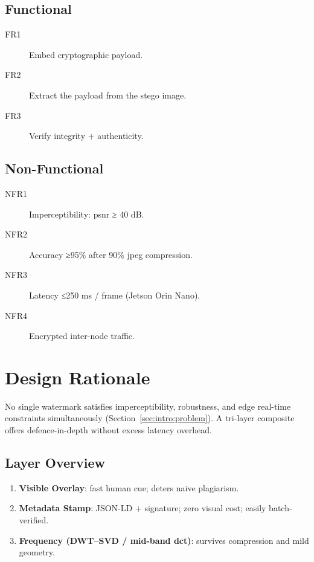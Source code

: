 \subsection{Functional}\label{subsec:functional}
\begin{description}
  \item[FR1] Embed cryptographic payload.
  \item[FR2] Extract the payload from the stego image.
  \item[FR3] Verify integrity + authenticity.
\end{description}

\subsection{Non-Functional}\label{subsec:non-functional}
\begin{description}
  \item[NFR1] Imperceptibility: \gls{psnr} ≥ 40 dB\@.
  \item[NFR2] Accuracy ≥95\% after 90\% \gls{jpeg} compression.
  \item[NFR3] Latency ≤250 ms / frame (Jetson Orin Nano).
  \item[NFR4] Encrypted inter-node traffic.
\end{description}

\section{Design Rationale}
\label{sec:deep_dive:rationale}
No single watermark satisfies imperceptibility, robustness, and edge real-time constraints simultaneously (Section~\ref{sec:intro:problem}). A tri-layer composite offers defence-in-depth without excess latency overhead.

\subsection{Layer Overview}\label{subsec:layer-overview}
\begin{enumerate}
  \item \textbf{Visible Overlay}: fast human cue; deters naive plagiarism.
  \item \textbf{Metadata Stamp}: JSON-LD + signature; zero visual cost; easily batch-verified.
  \item \textbf{Frequency (DWT–SVD / mid-band \gls{dct})}: survives compression and mild geometry.
\end{enumerate}

